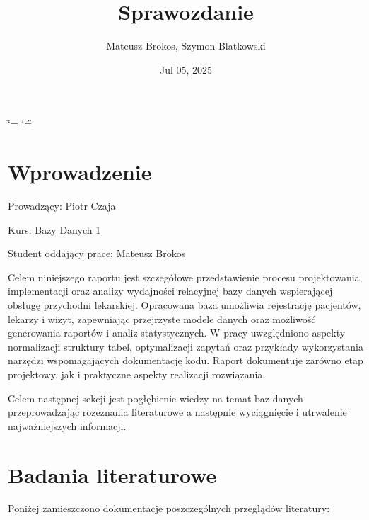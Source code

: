 \documentclass[a4paper,11pt,openany,english]{sphinxmanual}
\title{Sprawozdanie}
\date{Jul 05, 2025}
\author{Mateusz Brokos, Szymon Blatkowski}
\begin{document}
\ifdefined\shorthandoff
  \ifnum\catcode`\=\string=\active\shorthandoff{=}\fi
  \ifnum\catcode`\"=\active{}\fi
\fi

\pagestyle{empty}
\sphinxmaketitle
\pagestyle{plain}
\tableofcontents
\pagestyle{normal}
\label{\detokenize{index::doc}}


\sphinxstepscope


\chapter{Wprowadzenie}
\label{\detokenize{rozdzial1/index:wprowadzenie}}\label{\detokenize{rozdzial1/index::doc}}
\sphinxAtStartPar
Prowadzący: Piotr Czaja

\sphinxAtStartPar
Kurs: Bazy Danych 1

\sphinxAtStartPar
Student oddający prace: Mateusz Brokos

\sphinxAtStartPar
Celem niniejszego raportu jest szczegółowe przedstawienie procesu projektowania, implementacji oraz analizy wydajności relacyjnej bazy danych wspierającej obsługę przychodni lekarskiej. Opracowana baza umożliwia rejestrację pacjentów, lekarzy i wizyt, zapewniając przejrzyste modele danych oraz możliwość generowania raportów i analiz statystycznych. W pracy uwzględniono aspekty normalizacji struktury tabel, optymalizacji zapytań oraz przykłady wykorzystania narzędzi wspomagających dokumentację kodu. Raport dokumentuje zarówno etap projektowy, jak i praktyczne aspekty realizacji rozwiązania.

\sphinxAtStartPar
Celem następnej sekcji jest pogłębienie wiedzy na temat baz danych przeprowadzając rozeznania literaturowe a następnie wyciągnięcie i utrwalenie najważniejszych informacji.

\sphinxstepscope


\chapter{Badania literaturowe}
\label{\detokenize{rozdzial2/index:badania-literaturowe}}\label{\detokenize{rozdzial2/index::doc}}
\sphinxAtStartPar
Poniżej zamieszczono dokumentacje poszczególnych przeglądów literatury:

\sphinxstepscope
\end{document}
